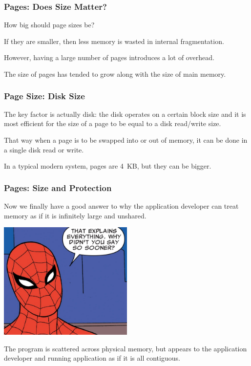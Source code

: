 \begin{frame}
\frametitle{Pages: Does Size Matter?}

How big should page sizes be? 

If they are smaller, then less memory is wasted in internal fragmentation. 

However, having a large number of pages introduces a lot of overhead. 

The size of pages has tended to grow along with the size of main memory.

\end{frame}

\begin{frame}
\frametitle{Page Size: Disk Size}

The key factor is actually disk: the disk operates on a certain block size and it is most efficient for the size of a page to be equal to a disk read/write size. 

That way when a page is to be swapped into or out of memory, it can be done in a single disk read or write. 

In a typical modern system, pages are 4~KB, but they can be bigger.

\end{frame}

\begin{frame}
\frametitle{Pages: Size and Protection}

Now we finally have a good answer to why the application developer can treat memory as if it is infinitely large and unshared. 

\begin{center}
	\includegraphics[width=0.5\textwidth]{images/explained.png}
\end{center}

The program is scattered across physical memory, but appears to the application developer and running application as if it is all contiguous. 

\end{frame}



